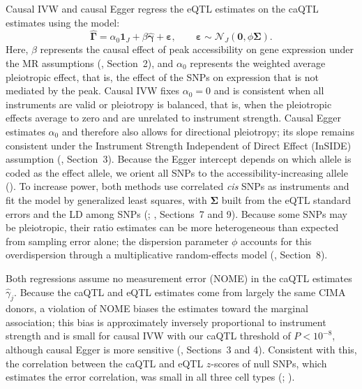 \noindent Causal IVW and causal Egger regress the eQTL estimates on the caQTL estimates using the model:
\[
\hat{\boldsymbol{\Gamma}}
= \alpha_0\boldsymbol{1}_J + \beta\hat{\boldsymbol{\gamma}}
  + \boldsymbol{\varepsilon},
\qquad
\boldsymbol{\varepsilon}
\sim \mathcal{N}_J(\boldsymbol{0},\phi\boldsymbol{\Sigma}).
\]
\noindent Here, \(\beta\) represents the causal effect of peak accessibility on gene expression under the MR assumptions (, Section~2), and \(\alpha_0\) represents the weighted average pleiotropic effect, that is, the effect of the SNPs on expression that is not mediated by the peak. Causal IVW fixes \(\alpha_0=0\) and is consistent when all instruments are valid or pleiotropy is balanced, that is, when the pleiotropic effects average to zero and are unrelated to instrument strength. Causal Egger estimates \(\alpha_0\) and therefore also allows for directional pleiotropy; its slope remains consistent under the Instrument Strength Independent of Direct Effect (InSIDE) assumption (, Section~3). Because the Egger intercept depends on which allele is coded as the effect allele, we orient all SNPs to the accessibility-increasing allele (). To increase power, both methods use correlated \textit{cis} SNPs as instruments and fit the model by generalized least squares, with \(\boldsymbol{\Sigma}\) built from the eQTL standard errors and the LD among SNPs (; , Sections~7 and 9). Because some SNPs may be pleiotropic, their ratio estimates can be more heterogeneous than expected from sampling error alone; the dispersion parameter \(\phi\) accounts for this overdispersion through a multiplicative random-effects model (, Section~8).

\noindent Both regressions assume no measurement error (NOME) in the caQTL estimates \(\hat{\gamma}_j\). Because the caQTL and eQTL estimates come from largely the same CIMA donors, a violation of NOME biases the estimates toward the marginal association; this bias is approximately inversely proportional to instrument strength and is small for causal IVW with our caQTL threshold of \(P<10^{-8}\), although causal Egger is more sensitive \cite{bowden2016nome} (, Sections~3 and 4). Consistent with this, the correlation between the caQTL and eQTL \(z\)-scores of null SNPs, which estimates the error correlation, was small in all three cell types (; ).

